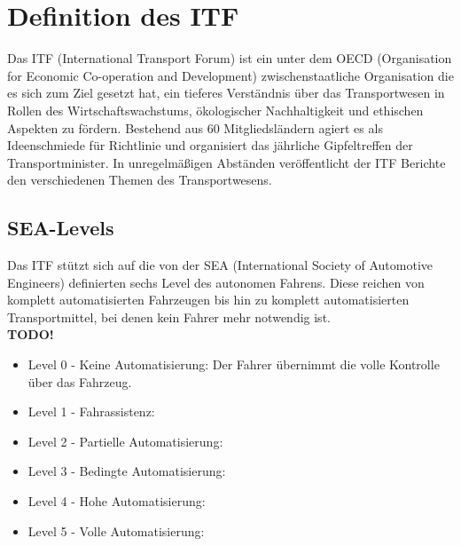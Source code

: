 \section{Definition des ITF}
\cite{websiteITF} Das ITF (International Transport Forum) ist ein unter dem OECD (Organisation for Economic Co-operation and Development) zwischenstaatliche Organisation die es sich zum Ziel gesetzt hat, ein tieferes Verständnis über das Transportwesen in Rollen des Wirtschaftswachstums, ökologischer Nachhaltigkeit und ethischen Aspekten zu fördern. Bestehend aus 60 Mitgliedsländern agiert es als Ideenschmiede für Richtlinie und organisiert das jährliche Gipfeltreffen der Transportminister. In unregelmäßigen Abständen veröffentlicht der ITF Berichte den verschiedenen Themen des Transportwesens.

\subsection{SEA-Levels}

\cite{standardSea}\cite{smith2015automated} Das ITF stützt sich auf die von der SEA (International Society of Automotive Engineers) definierten sechs Level des autonomen Fahrens. Diese reichen von komplett automatisierten Fahrzeugen bis hin zu komplett automatisierten Transportmittel, bei denen kein Fahrer mehr notwendig ist.\\

\textbf{TODO!}

\begin{itemize}
    \item Level 0 - Keine Automatisierung: Der Fahrer übernimmt die volle Kontrolle über das Fahrzeug.
    \item Level 1 - Fahrassistenz:
    \item Level 2 - Partielle Automatisierung:
    \item Level 3 - Bedingte Automatisierung:
    \item Level 4 - Hohe Automatisierung:
    \item Level 5 - Volle Automatisierung:
\end{itemize}